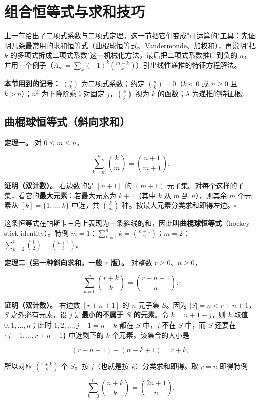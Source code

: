 \section{组合恒等式与求和技巧}


上一节给出了二项式系数与二项式定理。这一节把它们变成"可运算的"工具：先证明几条最常用的求和恒等式（曲棍球恒等式、Vandermonde、加权和），再说明"把 $k$ 的多项式拆成二项式系数"这一机械化方法，最后把二项式系数推广到负的 $n$，并用一个例子（$A_m=\sum_k(-1)^k\binom{m-k}{k}$）引出线性递推的特征方程解法。

\textbf{本节用到的记号：} $\binom nk$ 为二项式系数；约定 $\binom nk=0$（$k<0$ 或 $n\ge0$ 且 $k>n$）；$n^{\underline{k}}$ 为下降阶乘；对固定 $j$，$\binom kj$ 视为 $k$ 的函数；$\lambda$ 为递推的特征根。

\subsection{曲棍球恒等式（斜向求和）}


\textbf{定理一。} 对 $0\le m\le n$，

\[
\sum_{k=m}^{n}\binom km=\binom{n+1}{m+1}.
\]

\textbf{证明（双计数）。} 右边数的是 $[n+1]$ 的 $(m+1)$ 元子集。对每个这样的子集，看它的\textbf{最大元素}：若最大元素为 $k+1$（其中 $k$ 从 $m$ 到 $n$），则其余 $m$ 个元素从 $[k]=\{1,\dots,k\}$ 中选，共 $\binom km$ 种。按最大元素分类求和即得左边。$\square$

这条恒等式在帕斯卡三角上表现为一条斜线的和，因此叫\textbf{曲棍球恒等式}（hockey-stick identity）。特例 $m=1$：$\sum_{k=1}^n k=\binom{n+1}{2}$；$m=2$：$\sum_{k=2}^n\binom k2=\binom{n+1}{3}$。

\textbf{定理二（另一种斜向求和，一般 $r$ 版）。} 对整数 $r\ge0$、$n\ge0$，

\[
\sum_{k=0}^{n}\binom{r+k}{k}=\binom{r+n+1}{n}.
\]

\textbf{证明（双计数）。} 右边数 $[r+n+1]$ 的 $n$ 元子集 $S$。因为 $|S|=n<r+n+1$，$S$ 之外必有元素，设 $j$ 是\textbf{最小的不属于 $S$ 的元素}。令 $k=n+1-j$，则 $k$ 取值 $0,1,\dots,n$；此时 $1,2,\dots,j-1=n-k$ 都在 $S$ 中，$j$ 不在 $S$ 中，而 $S$ 还要在 $\{j+1,\dots,r+n+1\}$ 中选剩下的 $k$ 个元素。该集合的大小是

\[
(r+n+1)-(n-k+1)=r+k,
\]

所以对应 $\binom{r+k}{k}$ 个 $S$。按 $j$（也就是按 $k$）分类求和即得。取 $r=n$ 即得特例

\[
\sum_{k=0}^{n}\binom{n+k}{k}=\binom{2n+1}{n}.
\]

